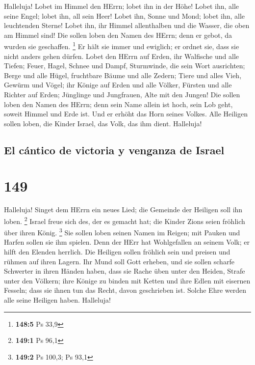  Halleluja! Lobet im Himmel den HErrn; lobet ihn in der
Höhe!  Lobet ihn, alle seine Engel; lobet ihn, all sein
Heer!  Lobet ihn, Sonne und Mond; lobet ihn, alle
leuchtenden Sterne!  Lobet ihn, ihr Himmel allenthalben
und die Wasser, die oben am Himmel sind!  Die sollen loben
den Namen des HErrn; denn er gebot, da wurden sie geschaffen.
\footnote{\textbf{148:5} Ps 33,9}  Er hält sie immer und
ewiglich; er ordnet sie, dass sie nicht anders gehen dürfen.
 Lobet den HErrn auf Erden, ihr Walfische und alle Tiefen;
 Feuer, Hagel, Schnee und Dampf, Sturmwinde, die sein Wort
ausrichten;  Berge und alle Hügel, fruchtbare Bäume und
alle Zedern;  Tiere und alles Vieh, Gewürm und Vögel;
 ihr Könige auf Erden und alle Völker, Fürsten und alle
Richter auf Erden;  Jünglinge und Jungfrauen, Alte mit
den Jungen!  Die sollen loben den Namen des HErrn; denn
sein Name allein ist hoch, sein Lob geht, soweit Himmel und Erde ist.
 Und er erhöht das Horn seines Volkes. Alle Heiligen
sollen loben, die Kinder Israel, das Volk, das ihm dient. Halleluja!

\hypertarget{el-cuxe1ntico-de-victoria-y-venganza-de-israel}{%
\subsection{El cántico de victoria y venganza de
Israel}\label{el-cuxe1ntico-de-victoria-y-venganza-de-israel}}

\hypertarget{section-148}{%
\section{149}\label{section-148}}

 Halleluja! Singet dem HErrn ein neues Lied; die Gemeinde
der Heiligen soll ihn loben. \footnote{\textbf{149:1} Ps 96,1}
 Israel freue sich des, der es gemacht hat; die Kinder
Zions seien fröhlich über ihren König. \footnote{\textbf{149:2} Ps
  100,3; Ps 93,1}  Sie sollen loben seinen Namen im
Reigen; mit Pauken und Harfen sollen sie ihm spielen. 
Denn der HErr hat Wohlgefallen an seinem Volk; er hilft den Elenden
herrlich.  Die Heiligen sollen fröhlich sein und preisen
und rühmen auf ihren Lagern.  Ihr Mund soll Gott erheben,
und sie sollen scharfe Schwerter in ihren Händen haben, 
dass sie Rache üben unter den Heiden, Strafe unter den Völkern;
 ihre Könige zu binden mit Ketten und ihre Edlen mit
eisernen Fesseln;  dass sie ihnen tun das Recht, davon
geschrieben ist. Solche Ehre werden alle seine Heiligen haben.
Halleluja!

